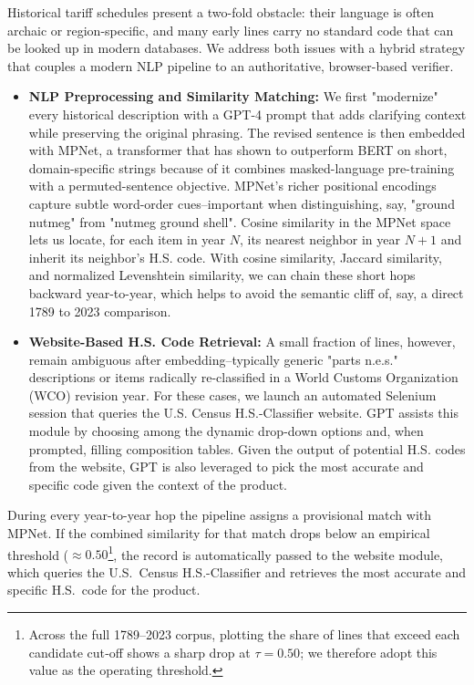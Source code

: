 \documentclass[12pt]{article}
\begin{document}
Historical tariff schedules present a two-fold obstacle: their language is often archaic or region-specific, and many early lines carry no standard code that can be looked up in modern databases. We address both issues with a hybrid strategy that couples a modern NLP pipeline to an authoritative, browser-based verifier.


\begin{itemize}
    \item \textbf{NLP Preprocessing and Similarity Matching:} 
    We first "modernize" every historical description with a GPT-4 prompt that adds clarifying context while preserving the original phrasing. The revised sentence is then embedded with MPNet, a transformer that has shown to outperform BERT on short, domain-specific strings because of it combines masked-language pre-training with a permuted-sentence objective. MPNet's richer positional encodings capture subtle word-order cues--important when distinguishing, say, "ground nutmeg" from "nutmeg ground shell". Cosine similarity in the MPNet space lets us locate, for each item in year $N$, its nearest neighbor in year $N+1$ and inherit its neighbor's H.S. code. With cosine similarity, Jaccard similarity, and normalized Levenshtein similarity, we can chain these short hops backward year-to-year, which helps to avoid the semantic cliff of, say, a direct 1789 to 2023 comparison.  
    
    \item \textbf{Website-Based H.S. Code Retrieval:} 
    A small fraction of lines, however, remain ambiguous after embedding--typically generic "parts n.e.s." descriptions or items radically re-classified in a World Customs Organization (WCO) revision year. For these cases, we launch an automated Selenium session that queries the U.S. Census H.S.-Classifier website. GPT assists this module by choosing among the dynamic drop-down options and, when prompted, filling composition tables. Given the output of potential H.S. codes from the website, GPT is also leveraged to pick the most accurate and specific code given the context of the product. 
\end{itemize}

During every year-to-year hop the pipeline assigns a provisional match with MPNet. If the combined similarity for that match drops below an empirical threshold ($\approx 0.50$\footnote{Across the full 1789–2023 corpus, plotting the share of lines that exceed each candidate cut‑off shows a sharp drop at $\tau=0.50$; we therefore adopt this value as the operating threshold.}, the record is automatically passed to the website module, which queries the U.S.\ Census H.S.-Classifier and retrieves the most accurate and specific H.S.\ code for the product.
\end{document}
